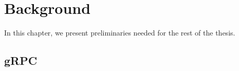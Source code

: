 \chapter{Background}
In this chapter, we present preliminaries needed for the rest of the thesis.
\label{chap:background}



\section{gRPC}